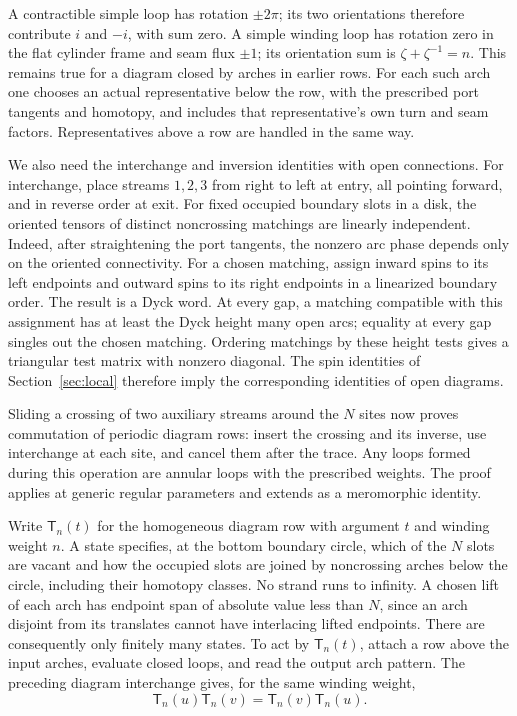 A contractible simple loop has rotation \(\pm2\pi\); its two
orientations therefore contribute \(i\) and \(-i\), with sum zero.
A simple winding loop has rotation zero in the flat cylinder frame
and seam flux \(\pm1\); its orientation sum is
\(\zeta+\zeta^{-1}=n\).  This remains true for a diagram closed by
arches in earlier rows.  For each such arch one chooses an actual
representative below the row, with the prescribed port tangents and
homotopy, and includes that representative's own turn and seam
factors.  Representatives above a row are handled in the same way.

We also need the interchange and inversion identities with open
connections.  For interchange, place streams \(1,2,3\) from right
to left at entry, all pointing forward, and in reverse order at exit.
For fixed occupied boundary slots in a disk, the
oriented tensors of distinct noncrossing matchings are linearly
independent.  Indeed, after straightening the port tangents, the
nonzero arc phase depends only on the oriented connectivity.  For a
chosen matching, assign inward spins to its left endpoints and outward
spins to its right endpoints in a linearized boundary order.  The
result is a Dyck word.  At every gap, a matching compatible with this
assignment has at least the Dyck height many open arcs; equality at
every gap singles out the chosen matching.  Ordering matchings by
these height tests gives a triangular test matrix with nonzero
diagonal.  The spin identities of Section~\ref{sec:local} therefore
imply the corresponding identities of open diagrams.

Sliding a crossing of two auxiliary streams around the \(N\) sites
now proves commutation of periodic diagram rows: insert the crossing
and its inverse, use interchange at each site, and cancel them after
the trace.  Any loops formed during this operation are annular loops
with the prescribed weights.  The proof applies at generic regular
parameters and extends as a meromorphic identity.

Write \(\mathsf T_n(t)\) for the homogeneous diagram row with argument
\(t\) and winding weight \(n\).  A state specifies, at the bottom
boundary circle, which of the \(N\) slots are vacant and how the
occupied slots are joined by noncrossing arches below the circle,
including their homotopy classes.  No strand runs to infinity.
A chosen lift of each arch has endpoint span of absolute value less
than \(N\), since an arch disjoint from its translates cannot have
interlacing lifted endpoints.  There are consequently only finitely
many states.  To act by \(\mathsf T_n(t)\), attach a row above the
input arches, evaluate closed loops, and read the output arch pattern.
The preceding diagram interchange gives, for the same winding weight,
\[
 \mathsf T_n(u)\mathsf T_n(v)=\mathsf T_n(v)\mathsf T_n(u).
\]

